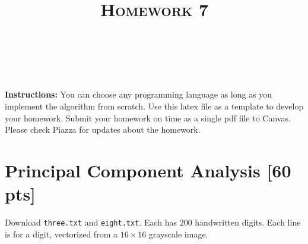 \documentclass[a4paper]{article}
\title{\textsc{Homework 7}} %
\author{
\red{$>>$NAME HERE$<<$} \\
\red{$>>$ID HERE$<<$}\\
}
\date{}
\theoremstyle{definition}
\begin{document}
\maketitle 


\textbf{Instructions:} 
You can choose any programming language as long as you implement the algorithm from scratch. Use this latex file as a template to develop your homework.
Submit your homework on time as a single pdf file to Canvas.
Please check Piazza for updates about the homework.\\


\section{ Principal Component Analysis [60 pts] 
}
Download {\tt three.txt} and {\tt eight.txt}. Each has $200$ handwritten digits. Each line is for a digit, vectorized from a $16\times 16$ grayscale image.
\end{document}
